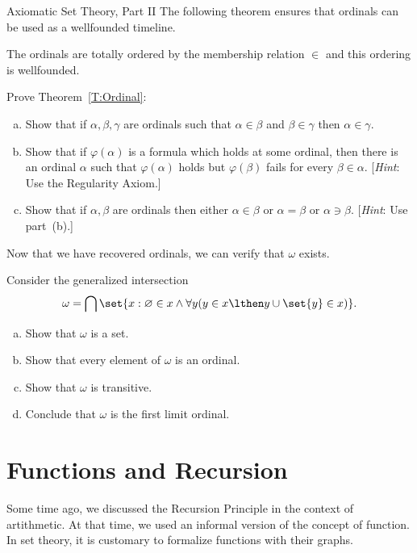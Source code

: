 \begin{unit}{Axiomatic Set Theory, Part II}
The following theorem ensures that ordinals can be used as a wellfounded timeline.

\begin{theorem}\label{T:Ordinal}
  The ordinals are totally ordered by the membership relation \(\in\) and this ordering is wellfounded.
\end{theorem}

\begin{problem}
  Prove Theorem~\ref{T:Ordinal}:
  \begin{enumerate}[(a)]
  \item Show that if \(\alpha,\beta,\gamma\) are ordinals such that \(\alpha \in \beta\) and \(\beta \in \gamma\) then \(\alpha \in \gamma.\)
  \item Show that if \(\varphi(\alpha)\) is a formula which holds at some ordinal, then there is an ordinal \(\alpha\) such that \(\varphi(\alpha)\) holds but \(\varphi(\beta)\) fails for every \(\beta \in \alpha.\)
    [\textit{Hint}: Use the Regularity Axiom.]
  \item Show that if \(\alpha,\beta\) are ordinals then either \(\alpha \in \beta\) or \(\alpha = \beta\) or \(\alpha \ni \beta.\)
    [\textit{Hint}: Use part~(b).]
  \end{enumerate}
\end{problem}

Now that we have recovered ordinals, we can verify that \(\omega\) exists.

\begin{problem}
  Consider the generalized intersection \[\omega = \bigcap \set{x : \varnothing \in x \land \forall y(y \in x \lthen y \cup \set{y} \in x)}.\]
  \begin{enumerate}[(a)]
  \item Show that \(\omega\) is a set.
  \item Show that every element of \(\omega\) is an ordinal.
  \item Show that \(\omega\) is transitive.
  \item Conclude that \(\omega\) is the first limit ordinal.
  \end{enumerate}
\end{problem}

\section{Functions and Recursion}

Some time ago, we discussed the Recursion Principle in the context of artithmetic.
At that time, we used an informal version of the concept of function.
In set theory, it is customary to formalize functions with their graphs.


\end{unit}
